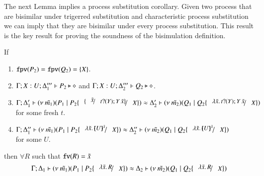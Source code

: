 
The next Lemma implies a process substitution corollary.
Given two process that are bisimilar under trigerred substitution
and characteristic process substitution we can imply that they are
bisimilar under every process substitution. This result is
the key result for proving the soundness of the bisimulation
definition.

\begin{lemma}\rm
	\label{lem:subst_equiv}
	If 
%
	\begin{enumerate}
		\item	$\mathtt{fpv}(P_2) = \mathtt{fpv}(Q_2) = \{X\}$.
		\item	$\Gamma; X: U; \Delta_1''' \vdash P_2 \triangleright \diamond$ and $\Gamma; X: U; \Delta_2''' \vdash Q_2 \triangleright \diamond$.
		\item	$\horel{\Gamma}{\Delta_1'}{\newsp{\tilde{m_1}}{P_1 \Par P_2 \subst{\subst{\tilde{x}}{\binp{t}{Y} \appl{Y}{\tilde{x}}}}{X}}}{\wb}{\Delta_2'}{\newsp{\tilde{m_2}}{Q_1 \Par Q_2 \subst{\abs{\tilde{x}}{\binp{t}{Y} \appl{Y}{\tilde{x}}}}{X}}}$ \\
			for some fresh $t$.

		\item	$\horel{\Gamma}{\Delta_1''}{\newsp{\tilde{m_1}}{P_1 \Par P_2 \subst{\abs{\tilde{x}}{\mapchar{U}{\tilde{x}}}}{X}}}{\wb}{\Delta_2''}{\newsp{\tilde{m_2}}{Q_1 \Par Q_2 \subst{\abs{\tilde{x}}{\mapchar{U}{\tilde{x}}}}{X}}}$\\
			for some $U$.
	\end{enumerate}
%
	then $\forall R$ such that $\mathtt{fv}(R) = \tilde{x}$
\[
	\horel{\Gamma}{\Delta_1}{\newsp{\tilde{m_1}}{P_1 \Par P_2 \subst{\abs{\tilde{x}}{R}}{X}}}
	{\wb}
	{\Delta_2}{\newsp{\tilde{m_2}}{Q_1 \Par Q_2 \subst{\abs{\tilde{x}}{R}}{X}}}
\]
\end{lemma}

